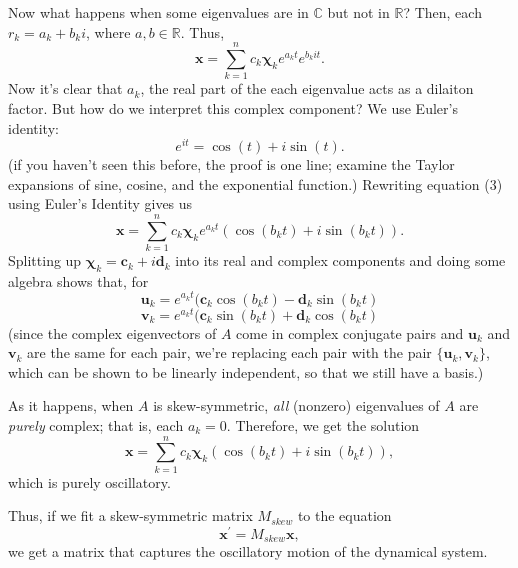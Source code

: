 \documentclass{res}
\newcommand{\bc}{\mathbf{c}}
\newcommand{\bd}{\mathbf{d}}
\newcommand{\bu}{\mathbf{u}}
\newcommand{\bv}{\mathbf{v}}
\newcommand{\bx}{\mathbf{x}}
\newcommand{\bchi}{\boldsymbol{\chi}}
\begin{document}
\begin{resume}
Now what happens when some eigenvalues are in $\mathbb{C}$ but not in
$\mathbb{R}$? Then, each $r_k = a_k + b_ki$, where $a,b \in \mathbb{R}$.
Thus,
\begin{equation}
\bx = \sum_{k = 1}^{n} c_k \bchi_k e^{a_k t}e^{b_k i t}.
\end{equation}
Now it's clear that $a_k$, the real part of the each eigenvalue acts as a
dilaiton factor. But how do we interpret this complex component? We use Euler's
identity:
\[e^{it} = \cos(t) + i\sin(t).\]
(if you haven't seen this before, the proof is one line; examine the Taylor
expansions of sine, cosine, and the exponential function.)
Rewriting equation (3) using Euler's Identity gives us
\[\bx
 = \sum_{k = 1}^{n}
            c_k \bchi_k e^{a_k t}\left(\cos(b_k t) + i\sin(b_k t)\right).\]
Splitting up $\bchi_k = \bc_k + i\bd_k$ into its real and complex components and
doing some algebra shows that, for
\[\bu_k = e^{a_kt}(\bc_k \cos(b_k t) - \bd_k \sin(b_k t)\]
\[\bv_k = e^{a_kt}(\bc_k \sin(b_k t) + \bd_k \cos(b_k t)\]
(since the complex eigenvectors of $A$ come in complex conjugate pairs and
$\bu_k$ and $\bv_k$ are the same for each pair, we're replacing each pair with the
pair $\{\bu_k,\bv_k\}$, which can be shown to be linearly independent, so that we
still have a basis.)

As it happens, when $A$ is skew-symmetric, \emph{all} (nonzero) eigenvalues of
$A$ are \emph{purely} complex; that is, each $a_k = 0$. Therefore, we get the
solution
\[\bx
 = \sum_{k = 1}^{n} c_k \bchi_k \left(\cos(b_k t) + i\sin(b_k t)\right),\]
which is purely oscillatory.

Thus, if we fit a skew-symmetric matrix $M_{skew}$ to the equation
\[\bx^{\prime} = M_{skew} \bx,\]
we get a matrix that captures the oscillatory motion of the dynamical system.


\end{resume}
\end{document}
